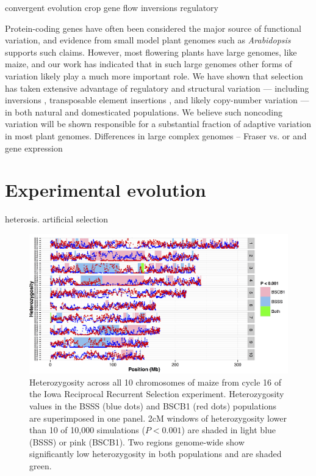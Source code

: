 \documentclass[11pt]{article}
\begin{document}
convergent evolution
crop gene flow
inversions regulatory

Protein-coding genes have often been considered the major source of functional variation, and evidence from small model plant genomes such as \emph{Arabidopsis} \citep[e.g.][]{hancock2011adaptation} supports such claims. 
However, most flowering plants have large genomes, like maize, and our work has indicated that in such large genomes other forms of variation likely play a much more important role.  
We have shown that selection has taken extensive advantage of regulatory \citep{swanson2012reshaping,pyhajarvi2013complex} and structural variation --- including inversions \citep{pyhajarvi2013complex,fang2012megabase}, transposable element insertions \citep{studer2011identification,makarevitch2015transposable}, and likely copy-number variation \citep{chia2012maize} --- in both natural and domesticated populations. We believe such noncoding variation will be shown responsible for a substantial fraction of adaptive variation in most plant genomes.
Differences in large complex genomes -- Fraser \citep{fraser2013gene} vs. \citep{pyhajarvi2013complex} or \citep{hancock2011adaptation} and gene expression \citep{hufford2012comparative}



\section*{Experimental evolution}

heterosis.
artificial selection

\begin{figure}[tb]   
  \begin{center}
\includegraphics[width=0.8\linewidth]{figs/gerke.png}
   \caption{Heterozygosity across all 10 chromosomes of maize from cycle 16 of the Iowa Reciprocal Recurrent Selection experiment. Heterozygosity values in the BSSS  (blue dots) and BSCB1 (red dots) populations are superimposed in one panel. 2cM windows of heterozygosity lower than 10 of 10,000 simulations ($P<0.001$) are shaded in light blue (BSSS) or pink (BSCB1). Two regions genome-wide show significantly low heterozygosity in both populations and are shaded green.} 
    \label{fig:heterotic}
  \end{center}
\end{figure}
\end{document}
